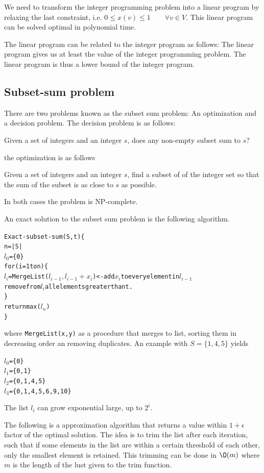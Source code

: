 \documentclass[10pt]{article}
\begin{document}
We need to transform the integer programming problem into a linear program by relaxing the last constraint, i.e. $0 \leq x(v) \leq 1 \qquad \forall v \in V$. This linear program can be solved optimal in polynomial time. 

The linear program can be related to the integer program as follows: The linear program gives us at least the value of the integer programming problem. The linear program is thus a lower bound of the integer program.

\subsection{Subset-sum problem} %
\label{sub:subset_sum_problem}
There are two problems known as the subset sum problem: An optimization and a decision problem. The decision problem is as follows:

\begin{definition}
Given a set of integers and an integer $s$, does any non-empty subset sum to $s$?  
\end{definition}
the optimization is as follows
\begin{definition}
Given a set of integers and an integer $s$, find a subset of of the integer set so that the sum of the subset is as close to $s$ as possible.
\end{definition}
In both cases the problem is NP-complete.


An exact solution to the subset sum problem is the following algorithm. 

\begin{alltt}
Exact-subset-sum(S,t)\{
  n = |S|
  \(l_0\) = \{0\}
  for(i=1 to n)\{
    \(l_i\) = MergeList(\(l_{i-1},l_{i-1}+x_i\))  <- add \(x_i\) to every element in \(l_{i-1}\)
    remove from \(l_i\) all elements greater than t.
  \}
  return max(\(l_n\))
\}  
\end{alltt}
where \texttt{MergeList(x,y)} as a procedure that merges to list, sorting them in decreasing order an removing duplicates. An example with $S = \{1, 4, 5\}$ yields

\begin{alltt}
\(l_0\) = \{0\}
\(l_1\) = \{0,1\}
\(l_2\) = \{0,1,4,5\}
\(l_3\) = \{0,1,4,5,6,9,10\}
\end{alltt}

The list $l_i$ can grow exponential large, up to $2^i$.

The following is a approximation algorithm that returns a value within $1+\epsilon$ factor of the optimal solution. The idea is to trim the list after each iteration, such that if some elements in the list are within a certain threshold of each other, only the smallest element is retained. This trimming can be done in $\O(m)$ where $m$ is the length of the lust given to the trim function.
\end{document}
